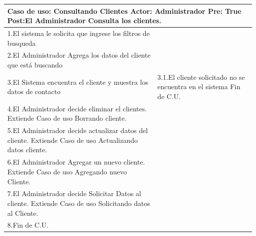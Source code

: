 \begin{longtable}{| p{} | p{} |}
    \hline
    \multicolumn{2}{|p{16cm}|}{
        \textbf{Caso de uso:} Consultando Clientes \newline
        \textbf{Actor:} Administrador\newline
        \textbf{Pre:}  True\newline
        \textbf{Post:}El Administrador Consulta los clientes.
    }\\
    \hline
    1.El sistema le solicita que ingrese los filtros de busqueda  & \\
    \hline
    2.El Administrador Agrega los datos del cliente que está buscando& \\
    \hline
    3.El Sistema encuentra el cliente y muestra los datos de contacto & 3.1.El cliente solicitado no se encuentra en el sistema \newline 3.2 Fin de C.U.  \\
    \hline
    4.El Administrador decide eliminar el clientes. Extiende Caso de uso Borrando cliente.& \\
    \hline
    5.El Administrador decide actualizar datos del cliente. Extiende Caso de uso Actualizando datos cliente.& \\
    \hline
    6.El Administrador Agregar un nuevo cliente. Extiende Caso de uso Agregando nuevo Cliente.& \\
    \hline
    7.El Administrador decide Solicitar Datos al cliente. Extiende Caso de uso Solicitando datos al Cliente.& \\
    \hline
    8.Fin de C.U.& \\
    \hline
\end{longtable}

